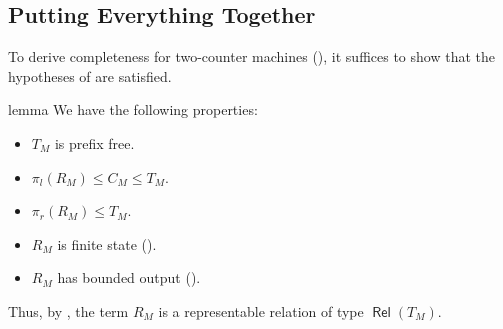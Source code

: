 \documentclass[11pt,a4paper]{amsart}
\theoremstyle{definition}
\DeclareMathOperator{\Rel}{\mathsf{Rel}}
\begin{document}
\subsection{Putting Everything Together}
\label{sec:finalizing}

To derive completeness for two-counter machines (), it
suffices to show that the hypotheses of  are
satisfied.

\begin{theoremEnd}[normal]{lemma}
  \label{lem:transition-is-representable}
  We have the following properties:
  \begin{itemize}
  \item $T_M$ is prefix free.
  \item $ \pi _l(R_M)  \leq  C_M  \leq  T_M$.
  \item $ \pi _r(R_M)  \leq  T_M$.
  \item $R_M$ is finite state ().
  \item $R_M$ has bounded output ().
  \end{itemize}
  Thus, by , the term $R_M$ is a
  representable relation of type $\Rel(T_M)$.
\end{theoremEnd}
\end{document}
